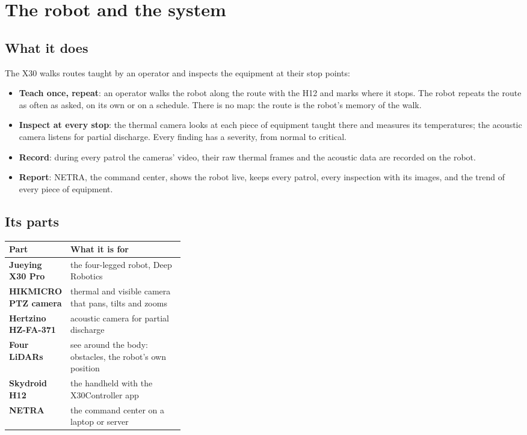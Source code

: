 \chapter{The robot and the system}
\label{ch:u-robot}

\section{What it does}

The X30 walks routes taught by an operator and inspects the equipment at their stop points:

\begin{itemize}
  \item \textbf{Teach once, repeat}: an operator walks the robot along the route with the H12 and
    marks where it stops. The robot repeats the route as often as asked, on its own or on a
    schedule. There is no map: the route is the robot's memory of the walk.
  \item \textbf{Inspect at every stop}: the thermal camera looks at each piece of equipment taught
    there and measures its temperatures; the acoustic camera listens for partial discharge.
    Every finding has a severity, from normal to critical.
  \item \textbf{Record}: during every patrol the cameras' video, their raw thermal frames and the
    acoustic data are recorded on the robot.
  \item \textbf{Report}: NETRA, the command center, shows the robot live, keeps every patrol,
    every inspection with its images, and the trend of every piece of equipment.
\end{itemize}

\section{Its parts}

\begin{center}
\begin{tabularx}{\linewidth}{@{}>{\bfseries}p{0.34\linewidth}X@{}}
  \toprule
  Part & What it is for \\
  \midrule
  Jueying X30 Pro & the four-legged robot, Deep Robotics \\
  HIKMICRO PTZ camera & thermal and visible camera that pans, tilts and zooms \\
  Hertzino HZ-FA-371 & acoustic camera for partial discharge \\
  Four LiDARs & see around the body: obstacles, the robot's own position \\
  Skydroid H12 & the handheld with the X30Controller app \\
  NETRA & the command center on a laptop or server \\
  \bottomrule
\end{tabularx}
\end{center}

